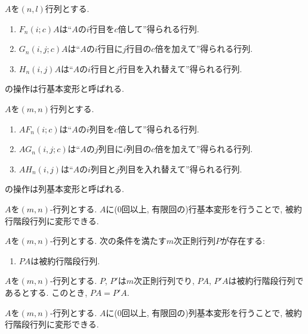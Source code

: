 \begin{prop}
  \label{prop:rowtranformation}
  $A$を$(n,l)$行列とする.
  \begin{enumerate}
  \item $F_n(i;c)A$は``$A$の$i$行目を$c$倍して''得られる行列.
  \item  $G_n(i,j;c)A$は``$A$の$i$行目に$j$行目の$c$倍を加えて''得られる行列.
  \item $H_n(i,j)A$は``$A$の$i$行目と$j$行目を入れ替えて''得られる行列.
  \end{enumerate}
\end{prop}
\begin{remark}
  の操作は行基本変形と呼ばれる.
\end{remark}


\begin{prop}
  \label{prop:coltranformation}
  $A$を$(m,n)$行列とする.
  \begin{enumerate}
  \item $AF_n(i;c)$は``$A$の$i$列目を$c$倍して''得られる行列.
  \item  $AG_n(i,j;c)$は``$A$の$j$列目に$i$列目の$c$倍を加えて''得られる行列.
  \item $AH_n(i,j)$は``$A$の$i$列目と$j$列目を入れ替えて''得られる行列.
  \end{enumerate}
\end{prop}
\begin{remark}
  の操作は列基本変形と呼ばれる.
\end{remark}


\begin{prop}
  $A$を$(m,n)$-行列とする.
  $A$に($0$回以上, 有限回の)行基本変形を行うことで,
  被約行階段行列に変形できる.
\end{prop}

\begin{prop}
  $A$を$(m,n)$-行列とする.
  次の条件を満たす$m$次正則行列$P$が存在する:
  \begin{enumerate}
    \item $PA$は被約行階段行列.
  \end{enumerate}
\end{prop}

\begin{prop}
  $A$を$(m,n)$-行列とする.
  $P$, $P'$は$m$次正則行列でり,
  $PA$, $P'A$は被約行階段行列であるとする.
  このとき, $PA=P'A$.
\end{prop}

\begin{prop}
  $A$を$(m,n)$-行列とする.
  $A$に($0$回以上, 有限回の)列基本変形を行うことで,
  被約行階段行列に変形できる.
\end{prop}

